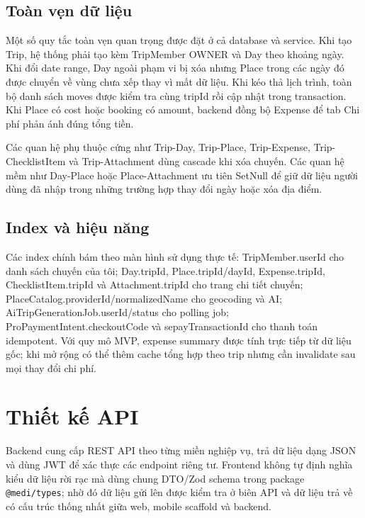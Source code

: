 \documentclass[a4paper]{report}
\begin{document}
\subsection{Toàn vẹn dữ liệu}

Một số quy tắc toàn vẹn quan trọng được đặt ở cả database và service. Khi tạo Trip, hệ thống phải tạo kèm TripMember OWNER và Day theo khoảng ngày. Khi đổi date range, Day ngoài phạm vi bị xóa nhưng Place trong các ngày đó được chuyển về vùng chưa xếp thay vì mất dữ liệu. Khi kéo thả lịch trình, toàn bộ danh sách moves được kiểm tra cùng tripId rồi cập nhật trong transaction. Khi Place có cost hoặc booking có amount, backend đồng bộ Expense để tab Chi phí phản ánh đúng tổng tiền.

Các quan hệ phụ thuộc cứng như Trip-Day, Trip-Place, Trip-Expense, Trip-ChecklistItem và Trip-Attachment dùng cascade khi xóa chuyến. Các quan hệ mềm như Day-Place hoặc Place-Attachment ưu tiên SetNull để giữ dữ liệu người dùng đã nhập trong những trường hợp thay đổi ngày hoặc xóa địa điểm.

\subsection{Index và hiệu năng}

Các index chính bám theo màn hình sử dụng thực tế: TripMember.userId cho danh sách chuyến của tôi; Day.tripId, Place.tripId/dayId, Expense.tripId, ChecklistItem.tripId và Attachment.tripId cho trang chi tiết chuyến; PlaceCatalog.providerId/normalizedName cho geocoding và AI; AiTripGenerationJob.userId/status cho polling job; ProPaymentIntent.checkoutCode và sepayTransactionId cho thanh toán idempotent. Với quy mô MVP, expense summary được tính trực tiếp từ dữ liệu gốc; khi mở rộng có thể thêm cache tổng hợp theo trip nhưng cần invalidate sau mọi thay đổi chi phí.

\section{Thiết kế API}

Backend cung cấp REST API theo từng miền nghiệp vụ, trả dữ liệu dạng JSON và dùng JWT để xác thực các endpoint riêng tư. Frontend không tự định nghĩa kiểu dữ liệu rời rạc mà dùng chung DTO/Zod schema trong package \texttt{@medi/types}; nhờ đó dữ liệu gửi lên được kiểm tra ở biên API và dữ liệu trả về có cấu trúc thống nhất giữa web, mobile scaffold và backend.
\end{document}
